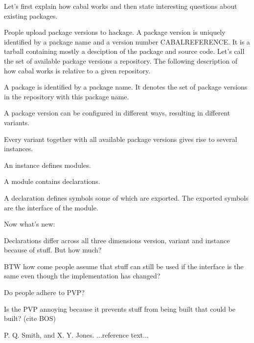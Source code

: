 \documentclass[preprint]{sigplanconf}
\begin{document}
Let's first explain how cabal works and then state interesting questions about existing packages.

People upload package versions to hackage. A package version is uniquely identified by a package name and a version number CABALREFERENCE. It is a tarball containing mostly a desciption of the package and source code. Let's call the set of available package versions a repository. The following description of how cabal works is relative to a given repository.

A package is identified by a package name. It denotes the set of package versions in the repository with this package name.

A package version can be configured in different ways, resulting in different variants.

Every variant together with all available package versions gives rise to several instances.

An instance defines modules.

A module contains declarations.

A declaration defines symbols some of which are exported. The exported symbols are the interface of the module.

Now what's new:

Declarations differ across all three dimensions version, variant and instance because of stuff. But how much?

BTW how come people assume that stuff can still be used if the interface is the same even though the implementation has changed?

Do people adhere to PVP?

Is the PVP annoying because it prevents stuff from being built that could be built? (cite BOS)











\begin{thebibliography}{}
\softraggedright

P. Q. Smith, and X. Y. Jones. ...reference text...

\end{thebibliography}
\end{document}
